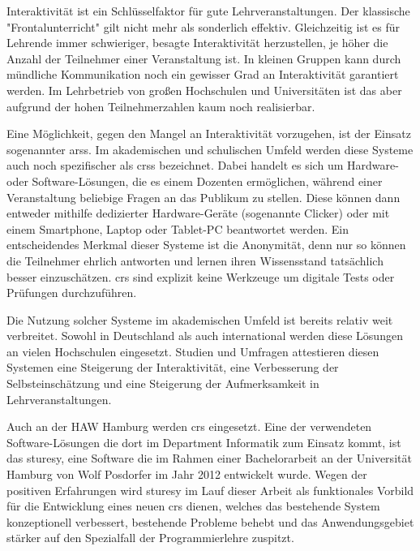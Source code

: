 Interaktivität ist ein Schlüsselfaktor für gute Lehrveranstaltungen. Der klassische "Frontalunterricht" gilt nicht mehr als sonderlich effektiv. Gleichzeitig ist es für Lehrende immer schwieriger, besagte Interaktivität herzustellen, je höher die Anzahl der Teilnehmer einer Veranstaltung ist. In kleinen Gruppen kann durch mündliche Kommunikation noch ein gewisser Grad an Interaktivität garantiert werden. Im Lehrbetrieb von großen Hochschulen und Universitäten ist das aber aufgrund der hohen Teilnehmerzahlen kaum noch realisierbar.

Eine Möglichkeit, gegen den Mangel an Interaktivität vorzugehen, ist der Einsatz sogenannter \acp{ars}. Im akademischen und schulischen Umfeld werden diese Systeme auch noch spezifischer als \acp{crs} bezeichnet. Dabei handelt es sich um Hardware- oder Software-Lösungen, die es einem Dozenten ermöglichen, während einer Veranstaltung beliebige Fragen an das Publikum zu stellen. Diese können dann entweder mithilfe dedizierter Hardware-Geräte (sogenannte Clicker) oder mit einem Smartphone, Laptop oder Tablet-PC beantwortet werden. Ein entscheidendes Merkmal dieser Systeme ist die Anonymität, denn nur so können die Teilnehmer ehrlich antworten und lernen ihren Wissensstand tatsächlich besser einzuschätzen. \ac{crs} sind explizit keine Werkzeuge um digitale Tests oder Prüfungen durchzuführen.

Die Nutzung solcher Systeme im akademischen Umfeld ist bereits relativ weit verbreitet. Sowohl in Deutschland als auch international werden diese Lösungen an vielen Hochschulen eingesetzt. Studien und Umfragen attestieren diesen Systemen eine Steigerung der Interaktivität, eine Verbesserung der Selbsteinschätzung und eine Steigerung der Aufmerksamkeit in Lehrveranstaltungen.\cite{web:wisconsin, web:tenyears}

Auch an der HAW Hamburg werden \ac{crs} eingesetzt. Eine der verwendeten Software-Lösungen die dort im Department Informatik zum Einsatz kommt, ist das \ac{sturesy}, eine Software die im Rahmen einer Bachelorarbeit an der Universität Hamburg von Wolf Posdorfer im Jahr 2012 entwickelt wurde\cite{sturesy}. Wegen der positiven Erfahrungen wird \ac{sturesy} im Lauf dieser Arbeit als funktionales Vorbild für die Entwicklung eines neuen \ac{crs} dienen, welches das bestehende System konzeptionell verbessert, bestehende Probleme behebt und das Anwendungsgebiet stärker auf den Spezialfall der Programmierlehre zuspitzt.